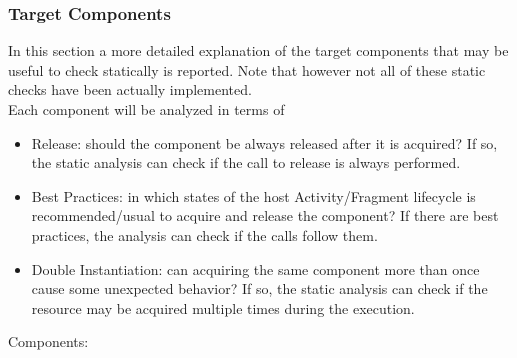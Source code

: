 \documentclass[11pt,a4paper,notitlepage]{article}
\begin{document}
\subsubsection{Target Components}
In this section a more detailed explanation of the target components that may be useful to check statically is reported. Note that however not all of these static checks have been actually implemented.\bigskip \\
Each component will be analyzed in terms of
\begin{itemize}
	\item Release: should the component be always released after it is acquired? If so, the static analysis can check if the call to release is always performed.
	\item Best Practices: in which states of the host Activity/Fragment lifecycle is recommended/usual to acquire and release the component? If there are best practices, the analysis can check if the calls follow them.
	\item Double Instantiation: can acquiring the same component more than once cause some unexpected behavior? If so, the static analysis can check if the resource may be acquired multiple times during the execution.
\end{itemize}
Components:
\end{document}
